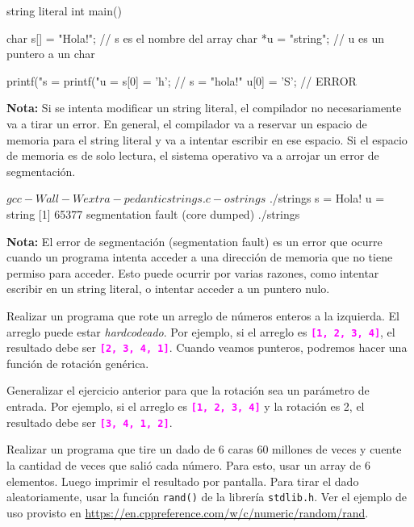 \documentclass[]{scrartcl}
\newcommand{\hl}[1]{\textcolor{magenta}{\textbf{\texttt{#1}}}}
\begin{document}
\begin{cbox}[]{string literal}
  int main(){
    char s[] = "Hola!"; // s es el nombre del array
    char *u = "string"; // u es un puntero a un char
    
    printf("s = %
    printf("u = %
    s[0] = 'h'; // s = "hola!"
    u[0] = 'S'; // ERROR
  }
\end{cbox}

\begin{notebox}
  \textbf{Nota:} Si se intenta modificar un string literal, el compilador no necesariamente va a tirar un error. En general, el compilador va a reservar un espacio de memoria para el string literal y va a intentar escribir en ese espacio. Si el espacio de memoria es de solo lectura, el sistema operativo va a arrojar un error de segmentación.
\end{notebox}

\begin{bashbox}
$ gcc -Wall -Wextra -pedantic strings.c -o strings
$ ./strings
s = Hola!
u = string
[1] 65377 segmentation fault (core dumped) ./strings  
\end{bashbox}

\begin{notebox}
  \textbf{Nota:} El error de segmentación (segmentation fault) es un error que ocurre cuando un programa intenta acceder a una dirección de memoria que no tiene permiso para acceder. Esto puede ocurrir por varias razones, como intentar escribir en un string literal, o intentar acceder a un puntero nulo.
\end{notebox}


\begin{exbox}
  Realizar un programa que rote un arreglo de números enteros a la izquierda. El arreglo puede estar \textit{hardcodeado}. Por ejemplo, si el arreglo es \hl{[1, 2, 3, 4]}, el resultado debe ser \hl{[2, 3, 4, 1]}. Cuando veamos punteros, podremos hacer una función de rotación genérica.
\end{exbox}
\begin{exbox}
  Generalizar el ejercicio anterior para que la rotación sea un parámetro de entrada. Por ejemplo, si el arreglo es \hl{[1, 2, 3, 4]} y la rotación es 2, el resultado debe ser \hl{[3, 4, 1, 2]}.
\end{exbox}
\begin{exbox}
  Realizar un programa que tire un dado de 6 caras 60 millones de veces y cuente la cantidad de veces que salió cada número. Para esto, usar un array de 6 elementos. Luego imprimir el resultado por pantalla.
  Para tirar el dado aleatoriamente, usar la función \texttt{rand()} de la librería \texttt{stdlib.h}. Ver el ejemplo de uso provisto en \url{https://en.cppreference.com/w/c/numeric/random/rand}.
\end{exbox}
\end{document}
